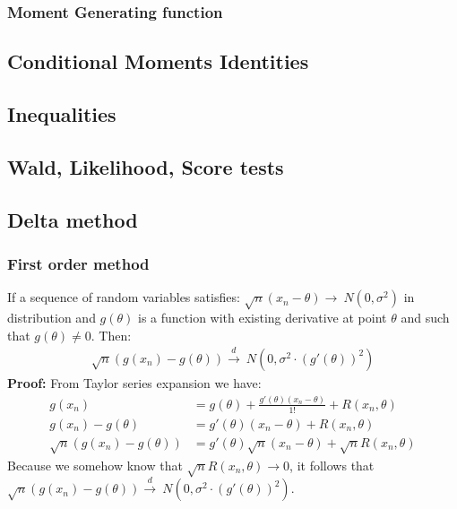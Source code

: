 \documentclass[]{article}
\begin{document}
\subsubsection{Moment Generating function}
\subsection{Conditional Moments Identities}
\subsection{Inequalities}
\subsection{Wald, Likelihood, Score tests}
\subsection{Delta method}
\subsubsection{First order method}
If a sequence of random variables satisfies: $\sqrt{n}(x_n - \theta) \rightarrow~N(0, \sigma^2)$ in distribution and $g(\theta)$ is a function with existing derivative at point $\theta$ and such that $g(\theta) \neq 0$. Then:
$$
\begin{aligned}
	\sqrt{n}(g(x_n) - g(\theta)) \overset{d}{\rightarrow}~N(0, \sigma^2\cdot (g'(\theta))^2)
\end{aligned}
$$
\textbf{Proof:} From Taylor series expansion we have:
$$
\begin{aligned}
	g(x_n) &= g(\theta) + \frac{g'(\theta)(x_n - \theta)}{1!} + R(x_n, \theta)\\
	g(x_n) - g(\theta) &= g'(\theta)(x_n - \theta) + R(x_n, \theta)\\
	\sqrt{n}(g(x_n) - g(\theta)) &= g'(\theta)\sqrt{n}(x_n - \theta) + \sqrt{n}R(x_n, \theta)
\end{aligned}
$$
Because we somehow know that $\sqrt{n}R(x_n, \theta) \rightarrow 0$, it follows that $	\sqrt{n}(g(x_n) - g(\theta)) \overset{d}{\rightarrow}~N(0, \sigma^2\cdot (g'(\theta))^2)$.
\end{document}
